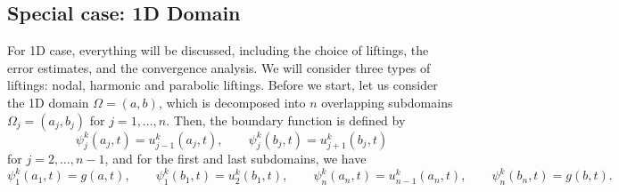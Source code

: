 \documentclass[a4paper, 11pt]{article}
\theoremstyle{remark}
\begin{document}
\subsection{Special case: 1D Domain}
For 1D case, everything will be discussed, including the choice of liftings, the error estimates, 
and the convergence analysis. We will consider three types of liftings: nodal, harmonic and parabolic
liftings. Before we start, let us consider the 1D domain $\Omega = (a, b)$, which is decomposed into 
$n$ overlapping subdomains $\Omega_j = (a_j, b_j)$ for $j = 1, \ldots, n$. Then, the boundary function
is defined by
\begin{equation*}
    \psi_{j}^{k}(a_j, t) = u_{j-1}^{k}(a_j, t), \qquad \psi_{j}^{k}(b_j, t) = u_{j+1}^{k}(b_j, t)
\end{equation*}
for $j = 2, \ldots, n-1$, and for the first and last subdomains, we have
\begin{equation*}
    \psi_{1}^{k}(a_1, t) = g(a, t), \qquad \psi_{1}^{k}(b_1, t) = u_{2}^{k}(b_1, t), \qquad \psi_{n}^{k}(a_n, t) = u_{n-1}^{k}(a_n, t), \qquad \psi_{n}^{k}(b_n, t) = g(b, t).
\end{equation*}
\end{document}
